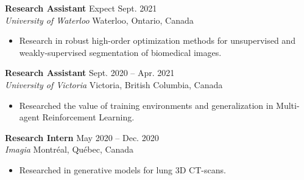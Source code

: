 \documentclass[11pt]{res} %
\begin{document}
\begin{resume}
\textbf{Research Assistant} \hfill Expect Sept. 2021\\
\textit{University of Waterloo} \hfill Waterloo, Ontario, Canada
\begin{itemize} \itemsep -2pt %
\item Research in robust high-order optimization methods for unsupervised and weakly-supervised segmentation of biomedical images.
\end{itemize}


\textbf{Research Assistant} \hfill Sept. 2020 -- Apr. 2021\\
\textit{University of Victoria} \hfill Victoria, British Columbia, Canada
\begin{itemize} \itemsep -2pt %
\item Researched the value of training environments and generalization in Multi-agent Reinforcement Learning.
\end{itemize}

\textbf{Research Intern} \hfill May 2020 -- Dec. 2020\\
\textit{Imagia} \hfill Montréal, Québec, Canada
\begin{itemize} \itemsep -2pt %
\item Researched in generative models for lung 3D CT-scans.
\end{itemize}


\end{resume}
\end{document}
